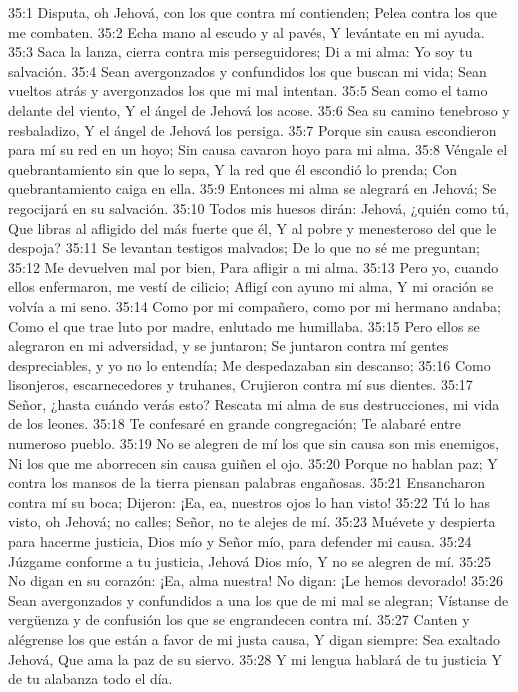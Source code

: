 35:1 Disputa, oh Jehová, con los que contra mí contienden; 
Pelea contra los que me combaten. 
35:2 Echa mano al escudo y al pavés, 
Y levántate en mi ayuda. 
35:3 Saca la lanza, cierra contra mis perseguidores; 
Di a mi alma: Yo soy tu salvación. 
35:4 Sean avergonzados y confundidos los que buscan mi vida; 
Sean vueltos atrás y avergonzados los que mi mal intentan. 
35:5 Sean como el tamo delante del viento, 
Y el ángel de Jehová los acose. 
35:6 Sea su camino tenebroso y resbaladizo, 
Y el ángel de Jehová los persiga. 
35:7 Porque sin causa escondieron para mí su red en un hoyo; 
Sin causa cavaron hoyo para mi alma. 
35:8 Véngale el quebrantamiento sin que lo sepa, 
Y la red que él escondió lo prenda; 
Con quebrantamiento caiga en ella. 
35:9 Entonces mi alma se alegrará en Jehová; 
Se regocijará en su salvación. 
35:10 Todos mis huesos dirán: Jehová, ¿quién como tú, 
Que libras al afligido del más fuerte que él, 
Y al pobre y menesteroso del que le despoja? 
35:11 Se levantan testigos malvados; 
De lo que no sé me preguntan; 
35:12 Me devuelven mal por bien, 
Para afligir a mi alma. 
35:13 Pero yo, cuando ellos enfermaron, me vestí de cilicio; 
Afligí con ayuno mi alma, 
Y mi oración se volvía a mi seno. 
35:14 Como por mi compañero, como por mi hermano andaba; 
Como el que trae luto por madre, enlutado me humillaba. 
35:15 Pero ellos se alegraron en mi adversidad, y se juntaron; 
Se juntaron contra mí gentes despreciables, y yo no lo entendía; 
Me despedazaban sin descanso; 
35:16 Como lisonjeros, escarnecedores y truhanes, 
Crujieron contra mí sus dientes. 
35:17 Señor, ¿hasta cuándo verás esto? 
Rescata mi alma de sus destrucciones, mi vida de los leones. 
35:18 Te confesaré en grande congregación; 
Te alabaré entre numeroso pueblo. 
35:19 No se alegren de mí los que sin causa son mis enemigos, 
Ni los que me aborrecen sin causa guiñen el ojo. 
35:20 Porque no hablan paz; 
Y contra los mansos de la tierra piensan palabras engañosas. 
35:21 Ensancharon contra mí su boca; 
Dijeron: ¡Ea, ea, nuestros ojos lo han visto! 
35:22 Tú lo has visto, oh Jehová; no calles; 
Señor, no te alejes de mí. 
35:23 Muévete y despierta para hacerme justicia, 
Dios mío y Señor mío, para defender mi causa. 
35:24 Júzgame conforme a tu justicia, Jehová Dios mío, 
Y no se alegren de mí. 
35:25 No digan en su corazón: ¡Ea, alma nuestra! 
No digan: ¡Le hemos devorado! 
35:26 Sean avergonzados y confundidos a una los que de mi mal se alegran; 
Vístanse de vergüenza y de confusión los que se engrandecen contra mí. 
35:27 Canten y alégrense los que están a favor de mi justa causa, 
Y digan siempre: Sea exaltado Jehová, 
Que ama la paz de su siervo. 
35:28 Y mi lengua hablará de tu justicia 
Y de tu alabanza todo el día. 
